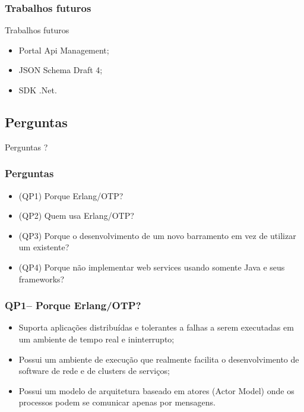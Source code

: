 \documentclass{beamer}
\begin{document}
\begin{frame}
  \frametitle{Trabalhos futuros}

  \begin{exampleblock}{Trabalhos futuros}
  
	  \begin{itemize}
 	    \item<1->Portal Api Management;
    	    \item<1->JSON Schema Draft 4;
    	    \item<1->SDK .Net.
	  \end{itemize}

  \end{exampleblock}

  
\end{frame}




\subsection{Perguntas}


\begin{frame}[c]{ }
\centering
  \huge{Perguntas ?}
\end{frame}


\begin{frame}
  \frametitle{Perguntas}

  \begin{exampleblock}{}
  
	  \begin{itemize}
		\item<1->(QP1) Porque Erlang/OTP?
		\item<1->(QP2) Quem usa Erlang/OTP?
	    \item<1->(QP3) Porque o desenvolvimento de um novo barramento em vez de utilizar um existente?
	    \item<1->(QP4) Porque não implementar web services usando somente Java e seus frameworks?
	  \end{itemize}
  
  \end{exampleblock}

  
\end{frame}


\begin{frame}
  \frametitle{QP1-- Porque Erlang/OTP?}

    \begin{itemize}
       \item<1-> Suporta aplicações distribuídas e tolerantes a falhas a serem executadas em um ambiente de tempo real e ininterrupto;
       \item<1-> Possui um ambiente de execução que realmente facilita o desenvolvimento de software de rede e de clusters de serviços;
       
       \item<1-> Possui um modelo de arquitetura baseado em atores (Actor Model) onde os processos podem 
       se comunicar apenas por mensagens.
       
    \end{itemize}
  
\end{frame}
\end{document}
